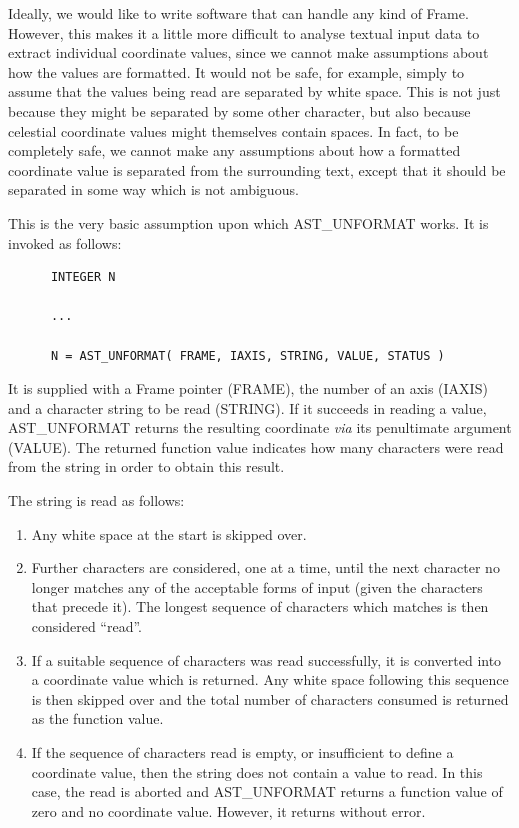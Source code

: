\documentclass[twoside,11pt]{article}
\begin{document}
Ideally, we would like to write software that can handle any kind of
Frame. However, this makes it a little more difficult to analyse
textual input data to extract individual coordinate values, since we
cannot make assumptions about how the values are formatted. It would
not be safe, for example, simply to assume that the values being read
are separated by white space. This is not just because they might be
separated by some other character, but also because celestial
coordinate values might themselves contain spaces. In fact, to be
completely safe, we cannot make any assumptions about how a formatted
coordinate value is separated from the surrounding text, except that
it should be separated in some way which is not ambiguous.

This is the very basic assumption upon which AST\_UNFORMAT works. It is
invoked as follows:

\small
\begin{verbatim}
      INTEGER N

      ...

      N = AST_UNFORMAT( FRAME, IAXIS, STRING, VALUE, STATUS )
\end{verbatim}
\normalsize

It is supplied with a Frame pointer (FRAME), the number of an axis
(IAXIS) and a character string to be read (STRING). If it succeeds in
reading a value, AST\_UNFORMAT returns the resulting coordinate
{\em{via}} its penultimate argument (VALUE). The returned function
value indicates how many characters were read from the string in order
to obtain this result.

The string is read as follows:

\begin{enumerate}
\item Any white space at the start is skipped over.

\item Further characters are considered, one at a time, until the next
character no longer matches any of the acceptable forms of input
(given the characters that precede it). The longest sequence of
characters which matches is then considered ``read''.

\item If a suitable sequence of characters was read successfully, it
is converted into a coordinate value which is returned. Any white
space following this sequence is then skipped over and the total
number of characters consumed is returned as the function value.

\item If the sequence of characters read is empty, or insufficient to
define a coordinate value, then the string does not contain a value to
read. In this case, the read is aborted and AST\_UNFORMAT returns a
function value of zero and no coordinate value. However, it returns
without error.
\end{enumerate}
\end{document}

